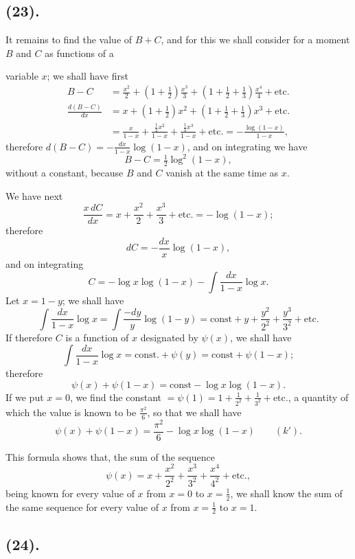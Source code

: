 \documentclass{article}
\begin{document}
\subsection*{(23).}

It remains to find the value of $B+C$, and for this we shall consider for a moment $B$ and $C$ as functions of a

variable $x$; we shall have first
\[ \begin{aligned} B-C&=\frac{x^{2}}{2}+\left(1+\tfrac{1}{2}\right)\frac{x^{3}}{3}+\left(1+\tfrac{1}{2}+\tfrac{1}{3}\right)\frac{x^{4}}{4}+\text{etc.}\\ \frac{d(B-C)}{dx}&=x+\left(1+\tfrac{1}{2}\right)x^{2}+\left(1+\tfrac{1}{2}+\tfrac{1}{3}\right)x^{3}+\text{etc.}\\ &=\frac{x}{1-x}+\frac{\frac{1}{2}x^{2}}{1-x}+\frac{\frac{1}{3}x^{3}}{1-x}+\text{etc.}=-\frac{\log(1-x)}{1-x}, \end{aligned} \]
therefore $d(B-C)=-\frac{dx}{1-x}\log(1-x)$, and on integrating we have
\[ B-C=\tfrac{1}{2}\log^{2}(1-x), \]
without a constant, because $B$ and $C$ vanish at the same time as $x$.

We have next
\[ \frac{x\,dC}{dx}=x+\frac{x^{2}}{2}+\frac{x^{3}}{3}+\text{etc.}=-\log(1-x); \]
therefore
\[ dC=-\frac{dx}{x}\log(1-x), \]
and on integrating
\[ C=-\log x\log(1-x)-\int\frac{dx}{1-x}\log x. \]
Let $x=1-y$; we shall have
\[ \int\frac{dx}{1-x}\log x=\int\frac{-dy}{y}\log(1-y)=\text{const}+y+\frac{y^{2}}{2^{2}}+\frac{y^{3}}{3^{2}}+\text{etc.} \]
If therefore $C$ is a function of $x$ designated by $\psi(x)$, we shall have
\[ \int\frac{dx}{1-x}\log x=\text{const.}+\psi(y)=\text{const}+\psi(1-x); \]
therefore
\[ \psi(x)+\psi(1-x)=\text{const}-\log x\log(1-x). \]
If we put $x=0$, we find the constant $=\psi(1)=1+\frac{1}{2^{2}}+\frac{1}{3^{2}}+\text{etc.}$, a quantity of which the value is known to be $\frac{\pi^{2}}{6}$, so that we shall have
\[ \psi(x)+\psi(1-x)=\frac{\pi^{2}}{6}-\log x\log(1-x)\qquad(k'). \]

This formula shows that, the sum of the sequence
\[ \psi(x)=x+\frac{x^{2}}{2^{2}}+\frac{x^{3}}{3^{2}}+\frac{x^{4}}{4^{2}}+\text{etc.}, \]
being known for every value of $x$ from $x=0$ to $x=\frac{1}{2}$, we shall know the sum of the same sequence for every value of $x$ from $x=\frac{1}{2}$ to $x=1$.

\subsection*{(24).}
\end{document}

